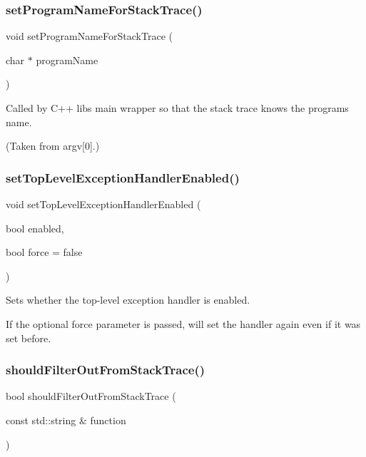 \subsubsection{\texorpdfstring{set\+Program\+Name\+For\+Stack\+Trace()}{setProgramNameForStackTrace()}}
{\footnotesize\ttfamily void set\+Program\+Name\+For\+Stack\+Trace (\begin{DoxyParamCaption}\item[{char $\ast$}]{program\+Name }\end{DoxyParamCaption})}



Called by C++ lib\textquotesingle{}s main wrapper so that the stack trace knows the program\textquotesingle{}s name. 

(Taken from argv\mbox{[}0\mbox{]}.) \mbox{\label{namespaceexceptions_ad979db40ba52ed7b58c8b78493dcaf84}} 
\subsubsection{\texorpdfstring{set\+Top\+Level\+Exception\+Handler\+Enabled()}{setTopLevelExceptionHandlerEnabled()}}
{\footnotesize\ttfamily void set\+Top\+Level\+Exception\+Handler\+Enabled (\begin{DoxyParamCaption}\item[{bool}]{enabled,  }\item[{bool}]{force = {\ttfamily false} }\end{DoxyParamCaption})}



Sets whether the top-\/level exception handler is enabled. 

If the optional \textquotesingle{}force\textquotesingle{} parameter is passed, will set the handler again even if it was set before. \mbox{\label{namespaceexceptions_ac20de63bd41bb6c1f95bd2af4c3eaf53}} 
\subsubsection{\texorpdfstring{should\+Filter\+Out\+From\+Stack\+Trace()}{shouldFilterOutFromStackTrace()}}
{\footnotesize\ttfamily bool should\+Filter\+Out\+From\+Stack\+Trace (\begin{DoxyParamCaption}\item[{const std\+::string \&}]{function }\end{DoxyParamCaption})}



